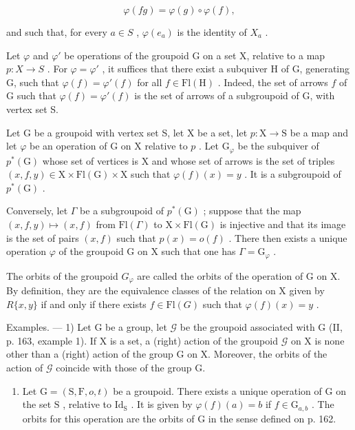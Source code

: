 \[
\varphi (f g) = \varphi (g) \circ \varphi (f),
\]

and such that, for every \(a \in S\) , \(\varphi(e_a)\) is the identity of \(X_a\) .

Let \(\varphi\) and \(\varphi'\) be operations of the groupoid G on a set X, relative to a map \(p\colon X\to S\) . For \(\varphi=\varphi'\) , it suffices that there exist a subquiver H of G, generating G, such that \(\varphi(f)=\varphi'(f)\) for all \(f\in\mathrm{Fl}(\mathrm{H})\) . Indeed, the set of arrows \(f\) of G such that \(\varphi(f)=\varphi'(f)\) is the set of arrows of a subgroupoid of G, with vertex set S.

Let G be a groupoid with vertex set S, let X be a set, let \(p \colon \mathrm{X} \to \mathrm{S}\) be a map and let \(\varphi\) be an operation of G on X relative to \(p\) . Let \(\mathrm{G}_{\varphi}\) be the subquiver of \(p^{*}(\mathrm{G})\) whose set of vertices is X and whose set of arrows is the set of triples \((x, f, y) \in \mathrm{X} \times \mathrm{Fl}(\mathrm{G}) \times \mathrm{X}\) such that \(\varphi(f)(x) = y\) . It is a subgroupoid of \(p^{*}(\mathrm{G})\) .

Conversely, let \(\Gamma\) be a subgroupoid of \(p^{*}(\mathrm{G})\) ; suppose that the map \((x,f,y)\mapsto (x,f)\) from \(\mathrm{Fl}(\Gamma)\) to \(\mathrm{X}\times \mathrm{Fl}(\mathrm{G})\) is injective and that its image is the set of pairs \((x,f)\) such that \(p(x) = o(f)\) . There then exists a unique operation \(\varphi\) of the groupoid G on X such that one has \(\Gamma = \mathrm{G}_{\varphi}\) .

The orbits of the groupoid \(G_{\varphi}\) are called the orbits of the operation of G on X. By definition, they are the equivalence classes of the relation on X given by \(R\{x,y\}\) if and only if there exists \(f \in \mathrm{Fl}(G)\) such that \(\varphi(f)(x) = y\) .

Examples. --- 1) Let G be a group, let \(\mathcal{G}\) be the groupoid associated with G (II, p. 163, example 1). If X is a set, a (right) action of the groupoid \(\mathcal{G}\) on X is none other than a (right) action of the group G on X. Moreover, the orbits of the action of \(\mathcal{G}\) coincide with those of the group G.

\begin{enumerate}
\def\labelenumi{\arabic{enumi})}
\setcounter{enumi}{1}
\tightlist
\item
  Let \(\mathrm{G} = (\mathrm{S},\mathrm{F},o,t)\) be a groupoid. There exists a unique operation of \(\mathrm{G}\) on the set \(\mathrm{S}\) , relative to \(\mathrm{Id}_{\mathrm{S}}\) . It is given by \(\varphi(f)(a) = b\) if \(f \in \mathrm{G}_{a,b}\) . The orbits for this operation are the orbits of \(\mathrm{G}\) in the sense defined on p. 162.
\end{enumerate}

